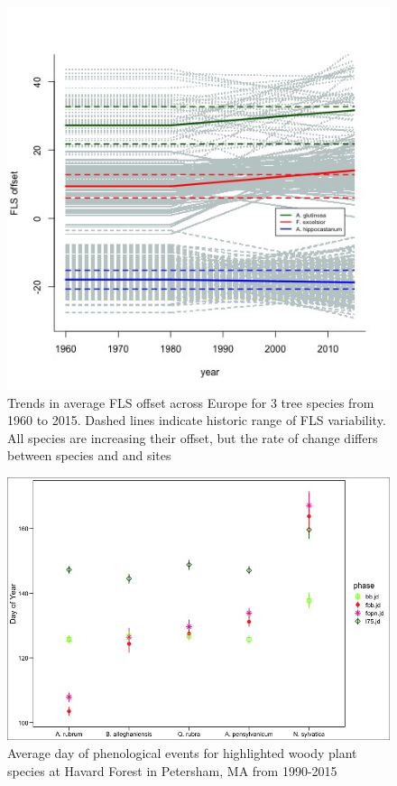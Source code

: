 \documentclass[12pt]{article}\usepackage[]{graphicx}\usepackage[]{color}
\begin{document}
\begin{figure}
    \centering
 \includegraphics[width=\textwidth]{..//figure/FLS_climate_change.jpeg} 
    \caption{Trends in average FLS offset across Europe for 3 tree species from 1960 to 2015. Dashed lines indicate historic range of FLS variability. All species are increasing their offset, but the rate of change differs between species and and sites}
    \label{fig:Figure 1}
\end{figure}
\begin{figure}
    \centering
    \includegraphics[width=\textwidth]{..//figure/HFmeans.jpeg}
    \caption{Average day of phenological events for highlighted woody plant species at Havard Forest in Petersham, MA from 1990-2015}
    \label{fig:Figure 2}
\end{figure}
\end{document}
